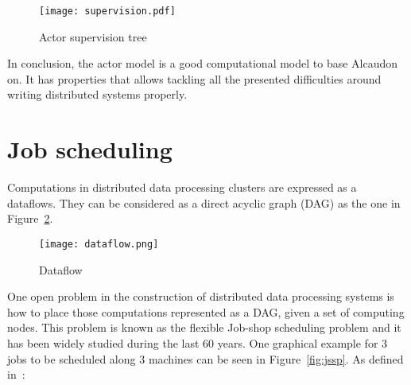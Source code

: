 \begin{figure}[!h]
\begin{center}
\texttt{[image: supervision.pdf]}
\caption{Actor supervision tree}
\label{fig:supervision}
\end{center}
\end{figure}

In conclusion, the actor model is a good computational model to base Alcaudon
on. It has properties that allows tackling all the presented difficulties around
writing distributed systems properly.

\section{Job scheduling}

Computations in distributed data processing clusters are expressed as a
dataflows. They can be considered as a direct acyclic graph (DAG) as the one in
Figure~\ref{fig:dataflow}.

\begin{figure}[h!]
\begin{center}
\texttt{[image: dataflow.png]}
\caption{Dataflow}
\label{fig:dataflow}
\end{center}
\end{figure}

One open problem in the construction of distributed data processing systems is
how to place those computations represented as a \acs{DAG}, given a set of computing
nodes. This problem is known as the flexible Job-shop scheduling problem and it
has been widely studied during the last 60 years. One graphical example for $3$
jobs to be scheduled along $3$ machines can be seen in Figure~\ref{fig:jssp}.
As defined in~\cite{jobshop2}:

